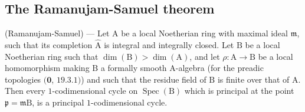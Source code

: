 \subsection{The Ramanujam-Samuel theorem}
\label{subsection:IV.21.14}
\label{IV.21.14}

\begin{theorem}[21.14.1]
\label{IV.21.14.1}
\textup{(Ramanujam-Samuel)} ---
Let $\mathrm{A}$ be a local Noetherian ring with maximal ideal $\mathfrak{m}$, such that its completion $\widehat{\mathrm{A}}$ is integral and integrally closed.
Let $\mathrm{B}$ be a local Noetherian ring such that $\dim(\mathrm{B})>\dim(\mathrm{A})$, and let $\rho:\mathrm{A}\to\mathrm{B}$ be a local homomorphism making $\mathrm{B}$ a formally smooth $\mathrm{A}$-algebra \textup{(}for the preadic topologies $(\mathbf{0}$, $19.3.1)$\textup{)} and such that the residue field of $\mathrm{B}$ is finite over that of $\mathrm{A}$.
Then every $1$-codimensional cycle on $\operatorname{Spec}(\mathrm{B})$ which is principal at the point $\mathfrak{p}=\mathfrak{m}\mathrm{B}$, is a principal $1$-codimensional cycle.
\end{theorem}

